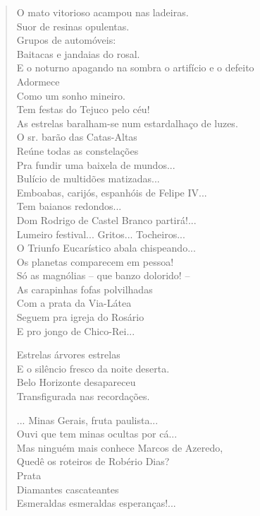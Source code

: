 \begin{verse}
O mato vitorioso acampou nas ladeiras.\\
Suor de resinas opulentas.\\
Grupos de automóveis:\\
Baitacas e jandaias do rosal.\\
E o noturno apagando na sombra o artifício e o defeito\\
Adormece\\
Como um sonho mineiro.\\
Tem festas do Tejuco pelo céu!\\
As estrelas baralham-se num estardalhaço de luzes.\\
O sr. barão das Catas-Altas\\
Reúne todas as constelações\\
Pra fundir uma baixela de mundos...\\
Bulício de multidões matizadas...\\
Emboabas, carijós, espanhóis de Felipe IV...\\
Tem baianos redondos...\\
Dom Rodrigo de Castel Branco partirá!...\\
Lumeiro festival... Gritos... Tocheiros...\\
O Triunfo Eucarístico abala chispeando...\\
Os planetas comparecem em pessoa!\\
Só as magnólias -- que banzo dolorido! --\\
As carapinhas fofas polvilhadas\\
Com a prata da Via-Látea\\
Seguem pra igreja do Rosário\\
E pro jongo de Chico-Rei...

Estrelas árvores estrelas\\
E o silêncio fresco da noite deserta.\\
Belo Horizonte desapareceu\\
Transfigurada nas recordações.

... Minas Gerais, fruta paulista...\\
Ouvi que tem minas ocultas por cá...\\
Mas ninguém mais conhece Marcos de Azeredo,\\
Quedê os roteiros de Robério Dias?\\
\quad\quad\quad{}Prata\\
\quad\quad{}Diamantes cascateantes\\
Esmeraldas esmeraldas esperanças!...


\end{verse}
